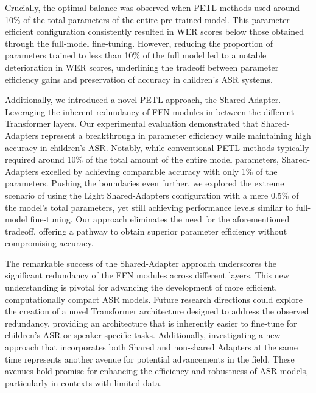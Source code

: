 Crucially, the optimal balance was observed when \ac{PETL} methods used around 10\% of the total parameters of the entire pre-trained model. This parameter-efficient configuration consistently resulted in \ac{WER} scores below those obtained through the full-model fine-tuning. However, reducing the proportion of parameters trained to less than 10\% of the full model led to a notable deterioration in \ac{WER} scores, underlining the tradeoff between parameter efficiency gains and preservation of accuracy in children's \ac{ASR} systems.


Additionally, we introduced a novel \ac{PETL} approach, the Shared-Adapter. Leveraging the inherent redundancy of \ac{FFN} modules in between the different Transformer layers. Our experimental evaluation demonstrated that Shared-Adapters represent a breakthrough in parameter efficiency while maintaining high accuracy in children's \ac{ASR}. Notably, while conventional \ac{PETL} methods typically required around 10\% of the total amount of the entire model parameters, Shared-Adapters excelled by achieving comparable accuracy with only 1\% of the parameters. Pushing the boundaries even further, we explored the extreme scenario of using the Light Shared-Adapters configuration with a mere 0.5\% of the model's total parameters, yet still achieving performance levels similar to full-model fine-tuning. Our approach eliminates the need for the aforementioned tradeoff, offering a pathway to obtain superior parameter efficiency without compromising accuracy.

The remarkable success of the Shared-Adapter approach underscores the significant redundancy of the \ac{FFN} modules across different layers. This new understanding is pivotal for advancing the development of more efficient, computationally compact \ac{ASR} models. Future research directions could explore the creation of a novel Transformer architecture designed to address the observed redundancy, providing an architecture that is inherently easier to fine-tune for children's \ac{ASR} or speaker-specific tasks. Additionally, investigating a new approach that incorporates both Shared and non-shared Adapters at the same time represents another avenue for potential advancements in the field. These avenues hold promise for enhancing the efficiency and robustness of \ac{ASR} models, particularly in contexts with limited data.